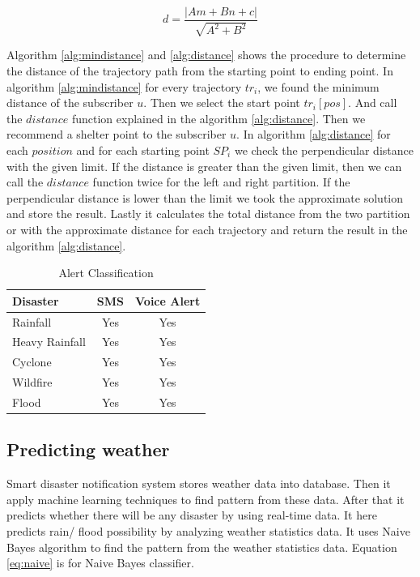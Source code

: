 \documentclass[conference]{IEEEtran}
\begin{document}
\begin{equation}
d = \frac{|Am+Bn+c|}{\sqrt{A^2+B^2}}
\label{eq:perpend}
\end{equation}



Algorithm \ref{alg:mindistance} and \ref{alg:distance} shows the procedure to determine the distance of the trajectory path from the starting point to ending point. In algorithm \ref{alg:mindistance} for every trajectory $tr_i$, we found the minimum distance of the subscriber $u$. Then we select the start point $tr_i$$[pos]$. And call the $distance$ function explained in the algorithm \ref{alg:distance}. Then we recommend a shelter point to the subscriber $u$.
In algorithm \ref{alg:distance} for each $position$ and for each starting point $SP_i$ we check the perpendicular distance with the given limit. If the distance is greater than the given limit, then we can call the $distance$ function twice for the left and right partition. If the perpendicular distance is lower than the limit we took the approximate solution and store the result. Lastly it calculates the total distance from the two partition or with the approximate distance for each trajectory and return the result in the algorithm \ref{alg:distance}.



\begin{table}[htp]
\centering
\caption{Alert Classification}

\begin{tabular}{|l|c|c|}
\hline
Disaster & SMS & Voice Alert \\
\hline
Rainfall & Yes & Yes \\
\hline
Heavy Rainfall & Yes & Yes  \\
\hline

Cyclone & Yes & Yes \\
\hline

Wildfire & Yes & Yes\\
\hline

Flood & Yes & Yes\\
\hline
\end{tabular}
\label{tab:alertclass}
\end{table}


\subsection{Predicting weather}
Smart disaster notification system stores weather data into database. Then it apply machine learning techniques to find pattern from these data. After that it predicts whether there will be any disaster by using real-time data. It here predicts rain/ flood possibility by analyzing weather statistics data. It uses Naive Bayes algorithm to find the pattern from the weather statistics data. Equation \ref{eq:naive} is for Naive Bayes classifier. 
\end{document}
